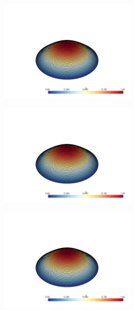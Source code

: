 \documentclass[
  11pt,
]{article}
\let\origfigure\figure
\let\endorigfigure\endfigure
\renewenvironment{figure}[1][2] {
    \expandafter\origfigure\expandafter[H]
} {
    \endorigfigure
}
\begin{document}
\begin{figure}
\centering
\includegraphics[width=0.5\textwidth,height=\textheight]{../img/mesh4-gauss05-b.png}
\caption{Finite element solution for problem 1 over mesh number 4 and
order-5 numerical integration.}
\end{figure}

\begin{figure}
\centering
\includegraphics[width=0.5\textwidth,height=\textheight]{../img/mesh4-gauss08-b.png}
\caption{Finite element solution for problem 1 over mesh number 4 and
order-8 numerical integration.}
\end{figure}

\begin{figure}
\centering
\includegraphics[width=0.5\textwidth,height=\textheight]{../img/mesh4-gauss13-b.png}
\caption{Finite element solution for problem 1 over mesh number 4 and
order-13 numerical integration.}
\end{figure}
\end{document}
